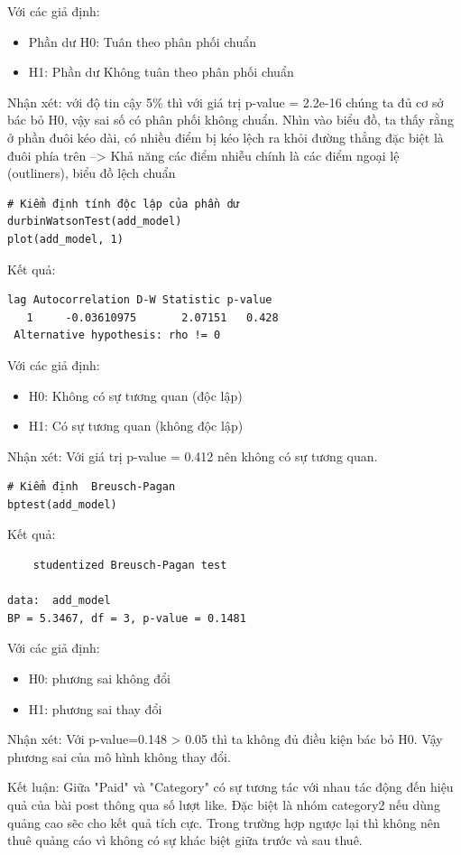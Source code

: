 \begin{itemize}
Với các giả định:
    \begin{itemize}
        \item Phần dư H0: Tuân theo phân phối chuẩn
        \item H1: Phần dư Không tuân theo phân phối chuẩn
    \end{itemize}
Nhận xét: với độ tin cậy 5\% thì với giá trị p-value = 2.2e-16 chúng ta đủ cơ sở bác bỏ H0, vậy sai số có phân phối không chuẩn. Nhìn vào biểu đồ, ta thấy rằng ở phần đuôi kéo dài, có nhiều điểm bị kéo lệch ra khỏi đường thẳng đặc biệt là đuôi phía trên --> Khả năng các điểm nhiễu chính là các điểm ngoại lệ (outliners), biểu đồ lệch chuẩn

\begin{lstlisting}
# Kiểm định tính độc lập của phần dư
durbinWatsonTest(add_model)
plot(add_model, 1)
\end{lstlisting}

Kết quả:
\begin{lstlisting}
lag Autocorrelation D-W Statistic p-value
   1     -0.03610975       2.07151   0.428
 Alternative hypothesis: rho != 0
\end{lstlisting}
Với các giả định:
    \begin{itemize}
        \item H0: Không có sự tương quan (độc lập)
        \item H1: Có sự tương quan (không độc lập)
    \end{itemize}
Nhận xét: Với giá trị p-value = 0.412 nên không có sự tương quan.

\begin{lstlisting}
# Kiểm định  Breusch-Pagan
bptest(add_model)
\end{lstlisting}
Kết quả:
\begin{lstlisting}
	studentized Breusch-Pagan test

data:  add_model
BP = 5.3467, df = 3, p-value = 0.1481
\end{lstlisting}
Với các giả định:
    \begin{itemize}
        \item H0: phương sai không đổi
        \item H1: phương sai thay đổi
    \end{itemize}
Nhận xét:  Với p-value=0.148 > 0.05 thì ta không đủ điều kiện bác bỏ H0. Vậy phương sai của mô hình không thay đổi.

 Kết luận: Giữa "Paid" và "Category" có sự tương tác với nhau tác động đến hiệu quả của bài post thông qua số lượt like. Đặc biệt là nhóm category2 nếu dùng quảng cao sẽc cho kết quả tích cực. Trong trường hợp ngược lại thì không nên thuê quảng cáo vì không có sự khác biệt giữa trước và sau thuê.
 

\end{itemize}

